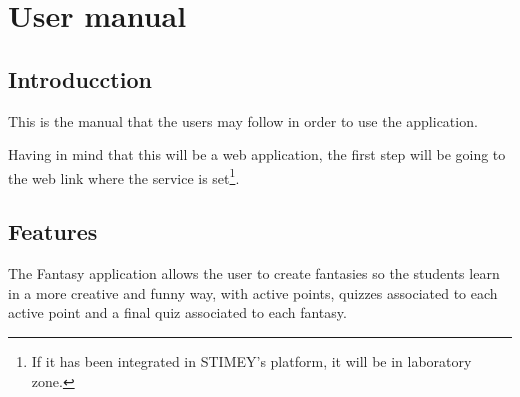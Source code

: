 \documentclass{book}
\newenvironment{changemargin}[2]{%
	\begin{list}{}{%
			\setlength{\topsep}{0pt}%
			\setlength{\leftmargin}{#1}%
			\setlength{\rightmargin}{#2}%
			\setlength{\listparindent}{\parindent}%
			\setlength{\itemindent}{\parindent}%
			\setlength{\parsep}{\parskip}%
		}%
		\item[]}{\end{list}}
\begin{document}
%
%
%	
%		
%		
%		
%		
%		
%		
%
%	
%
%
%	
%	
%

\newpage

%


\tableofcontents
\newpage
	
\chapter{User manual}
\section{Introducction}
This is the manual that the users may follow in order to use the application.

Having in mind that this will be a web application, the first step will be going to the web link where the service is set\footnote{If it has been integrated in STIMEY's platform, it will be in laboratory zone.}.


\section{Features}
The Fantasy application allows the user to create fantasies so the students learn in a more creative and funny way, with active points, quizzes associated to each active point and a final quiz associated to each fantasy.
\end{document}

